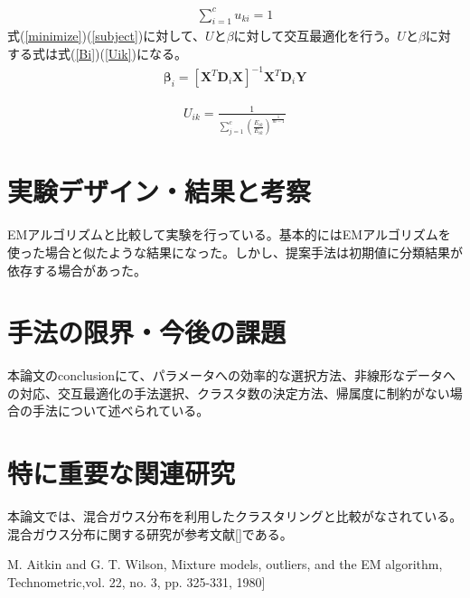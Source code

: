\documentclass[10pt,onecolumn]{jsarticle}
\begin{document}
\begin{align}
	\label{subject}
	\sum_{i=1}^{c} u_{k i}=1
\end{align}
式(\ref{minimize})(\ref{subject})に対して、$U$と$\beta$に対して交互最適化を行う。$U$と$\beta$に対する式は式(\ref{Bi})(\ref{Uik})になる。
\begin{align}
	\label{Bi}
	\boldsymbol{\beta}_{i}=\left[\boldsymbol{X}^{T} \boldsymbol{D}_{i} \boldsymbol{X}\right]^{-1} \boldsymbol{X}^{T} \boldsymbol{D}_{i} \boldsymbol{Y}
\end{align}

\begin{align}
	\label{Uik}
	U_{i k}=\frac{1}{\sum_{j=1}^{c}\left(\frac{E_{i k}}{E_{i k}}\right)^{\frac{1}{m-1}}}
\end{align}
\section{実験デザイン・結果と考察}
EMアルゴリズムと比較して実験を行っている。基本的にはEMアルゴリズムを使った場合と似たような結果になった。しかし、提案手法は初期値に分類結果が依存する場合があった。
\section{手法の限界・今後の課題}
本論文のconclusionにて、パラメータへの効率的な選択方法、非線形なデータへの対応、交互最適化の手法選択、クラスタ数の決定方法、帰属度に制約がない場合の手法について述べられている。
\section{特に重要な関連研究}
本論文では、混合ガウス分布を利用したクラスタリングと比較がなされている。混合ガウス分布に関する研究が参考文献[\cite{EM}]である。

\begin{thebibliography}{99}
%
M. Aitkin and G. T. Wilson, Mixture models, outliers, and the EM algorithm, Technometric,vol. 22, no. 3, pp. 325-331, 1980]

%
\end{thebibliography}



\end{document}

